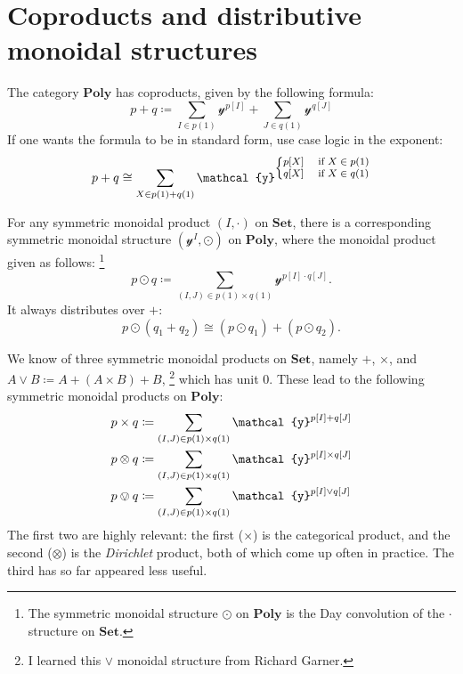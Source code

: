\documentclass[11pt, one side, article]{memoir}
\theoremstyle{definition}
\theoremstyle{plain}
\newcommand{\Cat}[1]{\mathbf{#1}}%
\newcommand{\tn}[1]{\textnormal{#1}}
\newcommand{\smset}{\Cat{Set}}
\newcommand{\yon}{\mathcal{y}}
\newcommand{\poly}{\Cat{Poly}}
\newcommand{\0}{\textsf{0}}
\newcommand{\1}{\tn{\textsf{1}}}
\begin{document}
\chapter{Coproducts and distributive monoidal structures}

The category $\poly$ has coproducts, given by the following formula:
\begin{equation}
p+q\coloneqq\sum_{I\in p(1)}\yon^{p[I]}+\sum_{J\in q(1)}\yon^{q[J]}
\end{equation}
If one wants the formula to be in standard form, use case logic in the exponent:
\begin{equation}
p+q\cong\sum_{X\in p(1)+q(1)}\yon^{\fontsize{8pt}{8pt}\selectfont
	\begin{cases}
  	p[X]&\tn{ if }X\in p(1)\\
  	q[X]&\tn{ if }X\in q(1)
	\end{cases}\normalsize
	}
\end{equation}

For any symmetric monoidal product $(I,\cdot)$ on $\smset$, there is a corresponding symmetric monoidal structure $(\yon^I,\odot)$ on $\poly$, where the monoidal product given as follows:%
\footnote{The symmetric monoidal structure $\odot$ on $\poly$ is the Day convolution of the $\cdot$ structure on $\smset$.}
\begin{equation}
p\odot q\coloneqq\sum_{(I,J)\in p(1)\times q(1)}\yon^{p[I]\cdot q[J]}.
\end{equation}
It always distributes over $+$:
\begin{equation}
p\odot(q_1+q_2)\cong (p\odot q_1)+(p\odot q_2).
\end{equation}

We know of three symmetric monoidal products on $\smset$, namely $+$, $\times$, and $A\vee B\coloneqq A+(A\times B)+B$,%
\footnote{I learned this $\vee$ monoidal structure from Richard Garner.}
which has unit $0$. These lead to the following symmetric monoidal products on $\poly$:
\begin{align}
	p\times q&\coloneqq\sum_{(I,J)\in p(1)\times q(1)}\yon^{p[I]+ q[J]}\\
	p\otimes q&\coloneqq\sum_{(I,J)\in p(1)\times q(1)}\yon^{p[I]\times q[J]}\\
	p\ovee q&\coloneqq\sum_{(I,J)\in p(1)\times q(1)}\yon^{p[I]\vee q[J]}\label{eqn.ovee}
\end{align}
The first two are highly relevant: the first ($\times$) is the categorical product, and the second ($\otimes$) is the \emph{Dirichlet} product, both of which come up often in practice. The third has so far appeared less useful.
\end{document}
